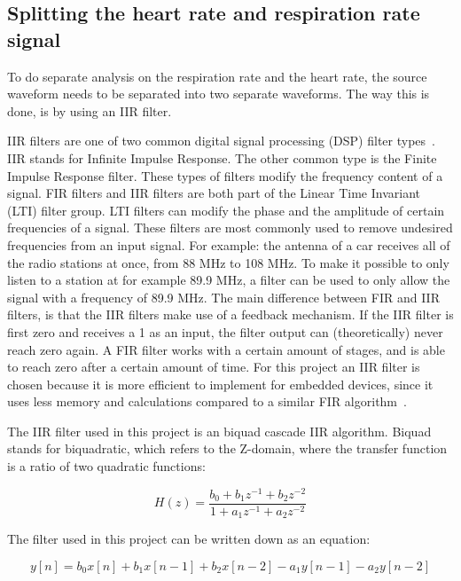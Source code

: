 \subsection{Splitting the heart rate and respiration rate signal}
To do separate analysis on the respiration rate and the heart rate, the source waveform needs to be separated into two separate waveforms. The way this is done, is by using an IIR filter.

IIR filters are one of two common digital signal processing (DSP) filter types~\cite{iir_info_website}. IIR stands for Infinite Impulse Response. The other common type is the Finite Impulse Response filter. These types of filters modify the frequency content of a signal. FIR filters and IIR filters are both part of the Linear Time Invariant (LTI) filter group. LTI filters can modify the phase and the amplitude of certain frequencies of a signal. These filters are most commonly used to remove undesired frequencies from an input signal. For example: the antenna of a car receives all of the radio stations at once, from 88 MHz to 108 MHz. To make it possible to only listen to a station at for example 89.9 MHz, a filter can be used to only allow the signal with a frequency of 89.9 MHz. The main difference between FIR and IIR filters, is that the IIR filters make use of a feedback mechanism. If the IIR filter is first zero and receives a 1 as an input, the filter output can (theoretically) never reach zero again. A FIR filter works with a certain amount of stages, and is able to reach zero after a certain amount of time. For this project an IIR filter is chosen because it is more efficient to implement for embedded devices, since it uses less memory and calculations compared to a similar FIR algorithm~\cite{iir_faq_website}. 

The IIR filter used in this project is an biquad cascade IIR algorithm. Biquad stands for biquadratic, which refers to the Z-domain, where the transfer function is a ratio of two quadratic functions:

\begin{equation}
\label{eq:biquad_filter_z}
    H(z)={\frac {b_{0}+b_{1}z^{-1}+b_{2}z^{-2}}{1+a_{1}z^{-1}+a_{2}z^{-2}}}
\end{equation}

The filter used in this project can be written down as an equation:

\begin{equation}
\label{eq:biquad_filter}
    y[n]=b_{0}x[n]+b_{1}x[n-1]+b_{2}x[n-2]-a_{1}y[n-1]-a_{2}y[n-2]
\end{equation}

